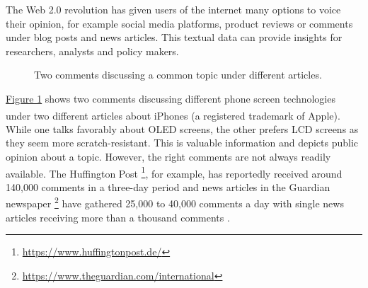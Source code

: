 The Web 2.0 revolution has given users of the internet many options to voice their opinion, for example social media platforms, product reviews or comments under blog posts and news articles.
This textual data can provide insights for researchers, analysts and policy makers. 
\begin{figure}[h]%
\label{screen}
%
%
\caption{Two comments discussing a common topic under different articles.\protect\footnotemark}
\end{figure}
\hyperref[screen]{Figure 1} shows two comments discussing different phone screen technologies under two different articles about iPhones\textsuperscript{\textregistered} (a registered trademark of Apple). While one talks favorably about OLED screens, the other prefers LCD screens as they seem more scratch-resistant. This is valuable information and depicts public opinion about a topic. However, the right comments are not always readily available.
The Huffington Post \footnote{\url{https://www.huffingtonpost.de/}}, for example, has reportedly received around 140,000 comments in a three-day period and news articles in the Guardian newspaper \footnote{\url{https://www.theguardian.com/international}} have gathered 25,000 to 40,000 comments a day \cite{DBLP:conf/ecir/AkerKBPBHG16} with single news articles receiving more than a thousand comments \cite{DBLP:conf/cikm/MaSYC12, llewellyn_grover_oberlander}.
